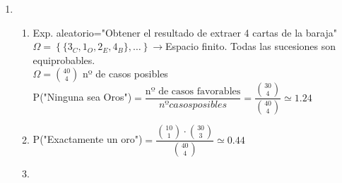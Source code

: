 \begin{enumerate}[label=\color{red}\textbf{\arabic*)}, leftmargin=*]
\begin{enumerate}[label=\color{red}\alph*)]
        Experimento aleatorio: "Observar el resultado al extraer 3 cartas de la baraja"\\
        $\Omega=\left\{\{3_T,2_E,1_P\},\{1_E,1_T,!_p\},\dots\right\}\longrightarrow$\begin{minipage}[l]{6cm}
        Espacio muestra finito. Todas las sucesiones son equiprobables.
        \end{minipage}
        
       ¿Cuántas hay? $|\Omega|=$ casos posibles\qquad{}\\
        $|\Omega|=\dbinom{52}{3}=\dfrac{52!}{3!(52-3)!}=22100$ n\textdegree de casos posibles\\
        P("Exactamente un as")$=\dfrac{\text{n\textdegree de casos favorables}}{n\textdegree casos posibles}=\dfrac{4512}{22100}\simeq0.2$\\
        n\textdegree casos posibles$=\dbinom{4}{1}\cdot\dbinom{48}{2}=4512$
        \item {}
        
        P("Haya al menos 1 as")=1-P("No haya ningún as")=$1-0.78=0.22$\\
        P("No haya ningún as")$=\dfrac{\binom{48}{3}}{\binom{52}{3}}\simeq0.78$
    \end{enumerate}
    \item {}
    \begin{enumerate}[label=\color{red}\alph*)]
    	\item {}
        
        Exp. aleatorio="Obtener el resultado de extraer 4 cartas de la baraja"\\
        $\Omega=\left\{\{3_C,1_O,2_E,4_B\},\dots\right\}\longrightarrow$Espacio finito. Todas las sucesiones son equiprobables. \\
        $\Omega=\binom{40}{4}$ nº de casos posibles\\
        P("Ninguna sea Oros")$=\dfrac{\text{nº de casos favorables}}{nº casos posibles}=\dfrac{\binom{30}{4}}{\binom{40}{4}}\simeq1.24$
        \item {}
        
        P("Exactamente un oro")$=\dfrac{\binom{10}{1}\cdot\binom{30}{3}}{\binom{40}{4}}\simeq0.44$
        \item {}
        

\end{enumerate}
\end{enumerate}

